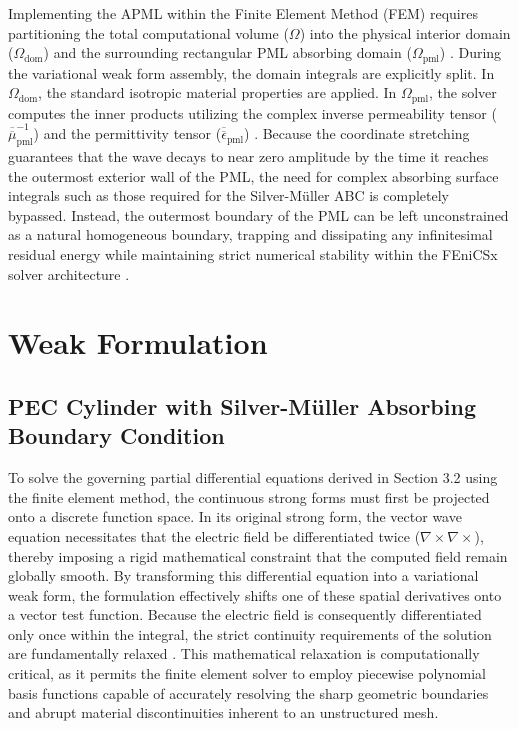 \vspace{12pt}

Implementing the APML within the Finite Element Method (FEM) requires partitioning the total computational volume ($\Omega$) into the physical interior domain ($\Omega_{\text{dom}}$) and the surrounding rectangular PML absorbing domain ($\Omega_{\text{pml}}$) \citep{Jiang2021}. During the variational weak form assembly, the domain integrals are explicitly split. In $\Omega_{\text{dom}}$, the standard isotropic material properties are applied. In $\Omega_{\text{pml}}$, the solver computes the inner products utilizing the complex inverse permeability tensor ($\overline{\overline{\mu}}_{\text{pml}}^{-1}$) and the permittivity tensor ($\overline{\overline{\epsilon}}_{\text{pml}}$) \citep{Jiao2003}. Because the coordinate stretching guarantees that the wave decays to near zero amplitude by the time it reaches the outermost exterior wall of the PML, the need for complex absorbing surface integrals such as those required for the Silver-M\"{u}ller ABC is completely bypassed. Instead, the outermost boundary of the PML can be left unconstrained as a natural homogeneous boundary, trapping and dissipating any infinitesimal residual energy while maintaining strict numerical stability within the FEniCSx solver architecture \citep{Bao2005}.

\section{Weak Formulation}

\subsection{PEC Cylinder with Silver-M\"{u}ller Absorbing Boundary Condition}

To solve the governing partial differential equations derived in Section 3.2 using the finite element method, the continuous strong forms must first be projected onto a discrete function space. In its original strong form, the vector wave equation necessitates that the electric field be differentiated twice ($\nabla \times \nabla \times$), thereby imposing a rigid mathematical constraint that the computed field remain globally smooth. By transforming this differential equation into a variational weak form, the formulation effectively shifts one of these spatial derivatives onto a vector test function. Because the electric field is consequently differentiated only once within the integral, the strict continuity requirements of the solution are fundamentally relaxed \citep{Frelet2024}. This mathematical relaxation is computationally critical, as it permits the finite element solver to employ piecewise polynomial basis functions capable of accurately resolving the sharp geometric boundaries and abrupt material discontinuities inherent to an unstructured mesh.

